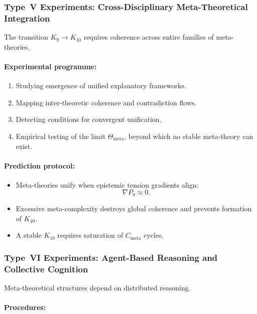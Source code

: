 \subsubsection{Type~V Experiments: Cross-Disciplinary Meta-Theoretical Integration}

The transition $K_9 \to K_{10}$ requires coherence across entire
families of meta-theories.

\paragraph{Experimental programme:}

\begin{enumerate}
    \item Studying emergence of unified explanatory frameworks.
    \item Mapping inter-theoretic coherence and contradiction flows.
    \item Detecting conditions for convergent unification.
    \item Empirical testing of the limit 
          $\Theta_{\mathrm{meta}}$, beyond which no stable 
          meta-theory can exist.
\end{enumerate}

\paragraph{Prediction protocol:}

\begin{itemize}
    \item Meta-theories unify when epistemic tension gradients align:
          \[
              \nabla P_9 \approx 0.
          \]
    \item Excessive meta-complexity destroys global coherence and
          prevents formation of $K_{10}$.
    \item A stable $K_{10}$ requires saturation of $C_{\mathrm{meta}}$ cycles.
\end{itemize}



\subsubsection{Type~VI Experiments: Agent-Based Reasoning and Collective Cognition}

Meta-theoretical structures depend on distributed reasoning.

\paragraph{Procedures:}

